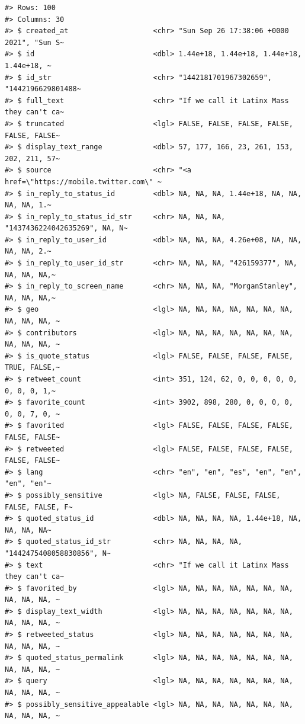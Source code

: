 \documentclass[
  letterpaper,
]{scrbook}
\begin{document}
\begin{verbatim}
#> Rows: 100
#> Columns: 30
#> $ created_at                    <chr> "Sun Sep 26 17:38:06 +0000 2021", "Sun S~
#> $ id                            <dbl> 1.44e+18, 1.44e+18, 1.44e+18, 1.44e+18, ~
#> $ id_str                        <chr> "1442181701967302659", "1442196629801488~
#> $ full_text                     <chr> "If we call it Latinx Mass they can't ca~
#> $ truncated                     <lgl> FALSE, FALSE, FALSE, FALSE, FALSE, FALSE~
#> $ display_text_range            <dbl> 57, 177, 166, 23, 261, 153, 202, 211, 57~
#> $ source                        <chr> "<a href=\"https://mobile.twitter.com\" ~
#> $ in_reply_to_status_id         <dbl> NA, NA, NA, 1.44e+18, NA, NA, NA, NA, 1.~
#> $ in_reply_to_status_id_str     <chr> NA, NA, NA, "1437436224042635269", NA, N~
#> $ in_reply_to_user_id           <dbl> NA, NA, NA, 4.26e+08, NA, NA, NA, NA, 2.~
#> $ in_reply_to_user_id_str       <chr> NA, NA, NA, "426159377", NA, NA, NA, NA,~
#> $ in_reply_to_screen_name       <chr> NA, NA, NA, "MorganStanley", NA, NA, NA,~
#> $ geo                           <lgl> NA, NA, NA, NA, NA, NA, NA, NA, NA, NA, ~
#> $ contributors                  <lgl> NA, NA, NA, NA, NA, NA, NA, NA, NA, NA, ~
#> $ is_quote_status               <lgl> FALSE, FALSE, FALSE, FALSE, TRUE, FALSE,~
#> $ retweet_count                 <int> 351, 124, 62, 0, 0, 0, 0, 0, 0, 0, 0, 1,~
#> $ favorite_count                <int> 3902, 898, 280, 0, 0, 0, 0, 0, 0, 7, 0, ~
#> $ favorited                     <lgl> FALSE, FALSE, FALSE, FALSE, FALSE, FALSE~
#> $ retweeted                     <lgl> FALSE, FALSE, FALSE, FALSE, FALSE, FALSE~
#> $ lang                          <chr> "en", "en", "es", "en", "en", "en", "en"~
#> $ possibly_sensitive            <lgl> NA, FALSE, FALSE, FALSE, FALSE, FALSE, F~
#> $ quoted_status_id              <dbl> NA, NA, NA, NA, 1.44e+18, NA, NA, NA, NA~
#> $ quoted_status_id_str          <chr> NA, NA, NA, NA, "1442475408058830856", N~
#> $ text                          <chr> "If we call it Latinx Mass they can't ca~
#> $ favorited_by                  <lgl> NA, NA, NA, NA, NA, NA, NA, NA, NA, NA, ~
#> $ display_text_width            <lgl> NA, NA, NA, NA, NA, NA, NA, NA, NA, NA, ~
#> $ retweeted_status              <lgl> NA, NA, NA, NA, NA, NA, NA, NA, NA, NA, ~
#> $ quoted_status_permalink       <lgl> NA, NA, NA, NA, NA, NA, NA, NA, NA, NA, ~
#> $ query                         <lgl> NA, NA, NA, NA, NA, NA, NA, NA, NA, NA, ~
#> $ possibly_sensitive_appealable <lgl> NA, NA, NA, NA, NA, NA, NA, NA, NA, NA, ~
\end{verbatim}
\end{document}
